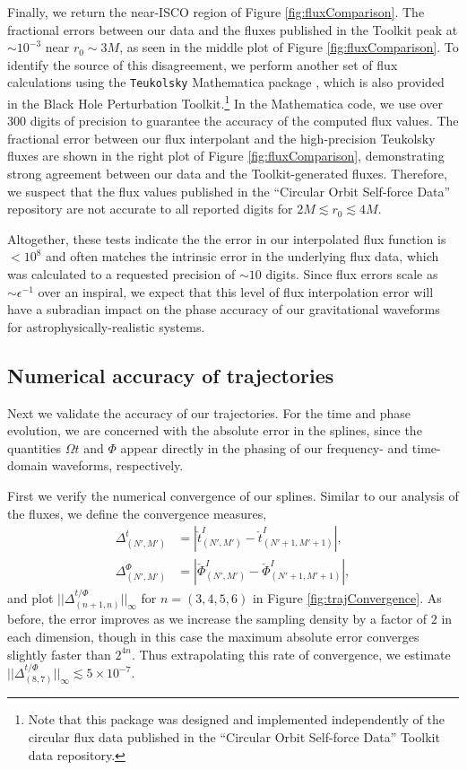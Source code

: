 \documentclass[%
 reprint,
 nofootinbib,
 amsmath,amssymb,
 aps,
 prd,
]{revtex4-2}
\begin{document}
Finally, we return the near-ISCO region of Figure \ref{fig:fluxComparison}. The fractional errors between our data and the fluxes published in the Toolkit peak at $\sim 10^{-3}$ near $r_0 \sim 3 M$, as seen in the middle plot of Figure \ref{fig:fluxComparison}. To identify the source of this disagreement, we perform another set of flux calculations using the \texttt{Teukolsky} Mathematica package \cite{BHPT_TEUK}, which is also provided in the Black Hole Perturbation Toolkit.\footnote{Note that this package was designed and implemented independently of the circular flux data published in the ``Circular Orbit Self-force Data'' Toolkit data repository.} In the Mathematica code, we use over 300 digits of precision to guarantee the accuracy of the computed flux values. The fractional error between our flux interpolant and the high-precision Teukolsky fluxes are shown in the right plot of Figure \ref{fig:fluxComparison}, demonstrating strong agreement between our data and the Toolkit-generated fluxes. Therefore, we suspect that the flux values published in the ``Circular Orbit Self-force Data'' repository are not accurate to all reported digits for $ 2M \lesssim r_0 \lesssim 4 M$.

Altogether, these tests indicate the the error in our interpolated flux function is $< 10^{8}$ and often matches the intrinsic error in the underlying flux data, which was calculated to a requested precision of $\sim 10$ digits. Since flux errors scale as $\sim \epsilon^{-1}$ over an inspiral, we expect that this level of flux interpolation error will have a subradian impact on the phase accuracy of our gravitational waveforms for astrophysically-realistic systems.

\subsection{Numerical accuracy of trajectories}
\label{app:trajtests}

Next we validate the accuracy of our trajectories. For the time and phase evolution, we are concerned with the absolute error in the splines, since the quantities $\Omega t$ and $\Phi$ appear directly in the phasing of our frequency- and time-domain waveforms, respectively. 

First we verify the numerical convergence of our splines. Similar to our analysis of the fluxes, we define the convergence measures,
\begin{align}
    \Delta^t_{(N',M')} &= \left| {\check{t}^I_{(N',M')}} - {\check{t}^I_{(N'+1,M'+1)}} \right|,
    \\
    \Delta^\Phi_{(N',M')} &= \left| {\check{\Phi}^I_{(N',M')}} - {\check{\Phi}^I_{(N'+1,M'+1)}} \right|,
\end{align}
and plot $|| \Delta^{t/\Phi}_{(n+1,n)}||_\infty$ for $n = (3, 4, 5, 6)$ in Figure \ref{fig:trajConvergence}. As before, the error improves as we increase the sampling density by a factor of $2$ in each dimension, though in this case the maximum absolute error converges slightly faster than $2^{4n}$. Thus extrapolating this rate of convergence, we estimate $|| \Delta^{t/\Phi}_{(8,7)}||_\infty \lesssim 5\times 10^{-7}$. 
\end{document}
